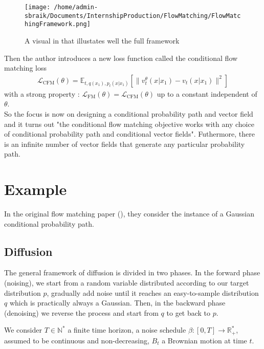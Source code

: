 \documentclass{article}
\begin{document}
\begin{figure}[h]
  \centering
  \texttt{[image: /home/admin-sbraik/Documents/InternshipProduction/FlowMatching/FlowMatchingFramework.png]}
  \caption{A visual in \cite{lipman2024flowmatchingguidecode} that illustates well the full framework}
  \label{fig:flow_matching_framework}
\end{figure}

Then the author introduces a new loss function called the conditional flow matching loss
\begin{align}
  \mathcal{L}_\text{CFM}(\theta) = \mathbb{E}_{t,q(x_1),p_t(x|x_1)}\left[\|v_t^\theta(x|x_1)-v_t(x|x_1)\|^2\right]
\end{align}
with a strong property : \(\mathcal{L}_\text{FM}(\theta)=\mathcal{L}_\text{CFM}(\theta)\) up to a constant independent of \(\theta\). \\
So the focus is now on designing a conditional probability path and vector field and it turns out "the conditional flow matching objective works with any choice of conditional probability path and conditional vector fields". Futhermore, there is an infinite number of vector fields that generate any particular probability path.\\



\section{Example}
In the original flow matching paper (\cite{lipman2023flowmatchinggenerativemodeling}), they consider the instance of a Gaussian conditional probability path.

\subsection{Diffusion}
The general framework of diffusion is divided in two phases. In the forward phase (noising), we start from a random variable distributed according to our target distribution \( p \), gradually add noise until it reaches an easy-to-sample distribution \(q\) which is practically always a Gaussian. Then, in the backward phase (denoising) we reverse the process and start from \(q\) to get back to \(p\). 

\bigskip

We consider \(T\in\mathbb{N}^{*}\) a finite time horizon, a noise schedule \(\beta:[0,T]\rightarrow \mathbb{R}_{+}^{*}\), assumed to be continuous and non-decreasing, \(B_t\) a Brownian motion at time \(t\).
\end{document}
